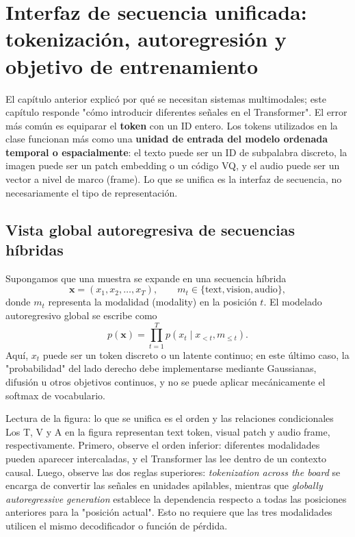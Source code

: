 \section{Interfaz de secuencia unificada: tokenización, autoregresión y objetivo de entrenamiento}

El capítulo anterior explicó por qué se necesitan sistemas multimodales; este capítulo responde "cómo introducir diferentes señales en el Transformer". El error más común es equiparar el \textbf{token} con un ID entero. Los tokens utilizados en la clase funcionan más como una \textbf{unidad de entrada del modelo ordenada temporal o espacialmente}: el texto puede ser un ID de subpalabra discreto, la imagen puede ser un patch embedding o un código VQ, y el audio puede ser un vector a nivel de marco (frame). Lo que se unifica es la interfaz de secuencia, no necesariamente el tipo de representación.

\subsection{Vista global autoregresiva de secuencias híbridas}

Supongamos que una muestra se expande en una secuencia híbrida
$$
\mathbf{x}=(x_1,x_2,\ldots,x_T),\qquad m_t\in\{\text{text},\text{vision},\text{audio}\},
$$
donde $m_t$ representa la modalidad (modality) en la posición $t$. El modelado autoregresivo global se escribe como
$$
p(\mathbf{x})=\prod_{t=1}^{T}p\!\left(x_t\mid x_{<t},m_{\le t}\right).
$$
Aquí, $x_t$ puede ser un token discreto o un latente continuo; en este último caso, la "probabilidad" del lado derecho debe implementarse mediante Gaussianas, difusión u otros objetivos continuos, y no se puede aplicar mecánicamente el softmax de vocabulario.


\begin{knowledgebox}{Lectura de la figura: lo que se unifica es el orden y las relaciones condicionales}
Los T, V y A en la figura representan text token, visual patch y audio frame, respectivamente. Primero, observe el orden inferior: diferentes modalidades pueden aparecer intercaladas, y el Transformer las lee dentro de un contexto causal. Luego, observe las dos reglas superiores: \textit{tokenization across the board} se encarga de convertir las señales en unidades apilables, mientras que \textit{globally autoregressive generation} establece la dependencia respecto a todas las posiciones anteriores para la "posición actual". Esto no requiere que las tres modalidades utilicen el mismo decodificador o función de pérdida.
\end{knowledgebox}


